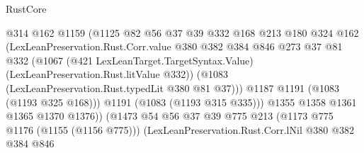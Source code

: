 \begin{lexlean}{RustCore}
\begin{coremodule}
                                        @314
                                        @162
                                        @1159
                                        (@1125
                                          @82
                                          @56
                                          @37
                                          @39
                                          @332
                                          @168
                                          @213
                                          @180
                                          @324
                                          @162
                                          (LexLeanPreservation.Rust.Corr.value
                                            @380
                                            @382
                                            @384
                                            @846
                                            @273
                                            @37
                                            @81
                                            @332
                                            (@1067
                                              (@421 LexLeanTarget.TargetSyntax.Value)
                                              (LexLeanPreservation.Rust.litValue @332))
                                            (@1083
                                              (LexLeanPreservation.Rust.typedLit @380 @81 @37)))
                                          @1187
                                          @1191
                                          (@1083 (@1193 @325 @168)))
                                        @1191
                                        (@1083 (@1193 @315 @335)))
                                      @1355
                                      @1358
                                      @1361
                                      @1365
                                      @1370
                                      @1376))
                                  (@1473
                                    @54
                                    @56
                                    @37
                                    @39
                                    @775
                                    @213
                                    (@1173 @775 @1176 (@1155 (@1156 @775)))
                                    (LexLeanPreservation.Rust.Corr.lNil
                                      @380
                                      @382
                                      @384
                                      @846

\end{coremodule}
\end{lexlean}
